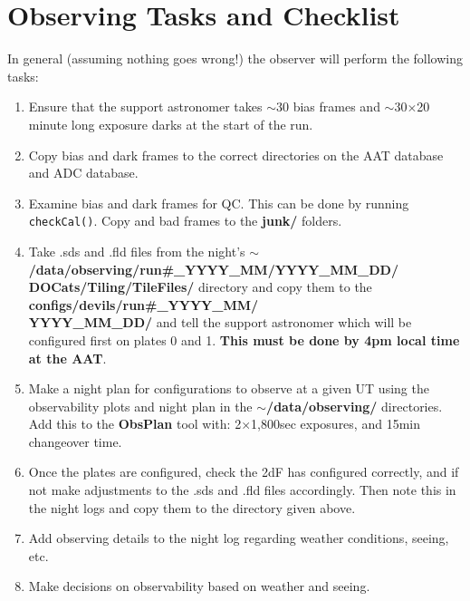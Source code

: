 \documentclass[12pt]{article}
\begin{document}
\section{Observing Tasks and Checklist}
\label{sec:summary}

In general (assuming nothing goes wrong!) the observer will perform the following tasks:\\

\begin{enumerate}

\item Ensure that the support astronomer takes $\sim30$ bias frames and $\sim30$$\times$20 minute long exposure darks at the start of the run.

\item Copy bias and dark frames to the correct directories on the AAT database and ADC database. 

\item Examine bias and dark frames for QC. This can be done by running \texttt{checkCal()}. Copy and bad frames to the \textbf{junk/} folders.

\item Take .sds and .fld files from the night's \textbf{$\sim$/data/observing/run\#\_YYYY\_MM/YYYY\_MM\_DD/ \\
DOCats/Tiling/TileFiles/} directory and copy them to the \textbf{configs/devils/run\#\_YYYY\_MM/ \\
YYYY\_MM\_DD/} and tell the support astronomer which will be configured first on plates 0 and 1.   \textbf{\textcolor{PineGreen}{This must be done by 4pm local time at the AAT}}.

\item Make a night plan for configurations to observe at a given UT using the observability plots and night plan in the \textbf{$\sim$/data/observing/} directories. Add this to the \textbf{ObsPlan} tool with: 2$\times$1,800sec exposures, and 15min changeover time. 

\item Once the plates are configured, check the 2dF has configured correctly, and if not make adjustments to the .sds and .fld files accordingly. Then note this in the night logs and copy them to the directory given above. 

\item Add observing details to the night log regarding weather conditions, seeing, etc.

\item Make decisions on observability based on weather and seeing. 


\end{enumerate}
\end{document}
